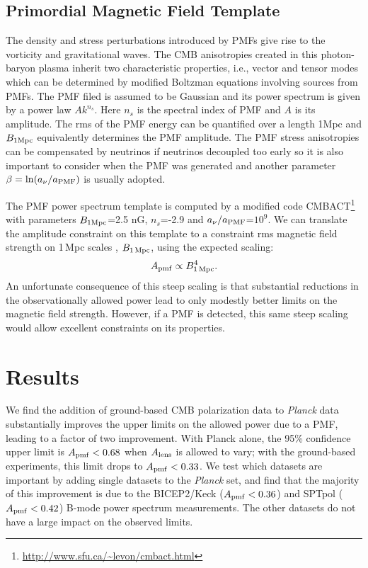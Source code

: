 \documentclass[preprint]{emulateapj}
\newcommand{\apmf}{\ensuremath{A_{\rm pmf}}}
\newcommand{\bpmf}{\ensuremath{B_{\rm 1\,Mpc}}}
\newcommand{\alens}{\ensuremath{A_{\rm lens}}}
\newcommand{\be}{\begin{equation}}
\newcommand{\ee}{\end{equation}}
\newcommand{\planck}{{\sl Planck}}
\newcommand{\bicepkeck}{BICEP2/Keck}
\newcommand{\sptpol}{SPTpol}
\begin{document}
\subsection{Primordial Magnetic Field Template}


The density and stress perturbations introduced by PMFs give rise to the vorticity and gravitational waves. 
The CMB anisotropies created in this photon-baryon plasma inherit two characteristic properties, i.e., vector and tensor modes which can be determined by modified Boltzman equations involving sources from PMFs. 
The PMF filed is assumed to be Gaussian and its power spectrum is given by a power law $Ak^{n_s}$. 
Here $n_s$ is the spectral index of PMF and $A$ is its amplitude. 
The rms of the PMF energy can be quantified over a length 1\rm{Mpc} and $B_{\rm{1Mpc}}$ equivalently determines the PMF amplitude. 
The PMF stress anisotropies can be compensated by neutrinos if neutrinos decoupled too early so it is also important to consider when the PMF was generated and another parameter $\beta=\ln(a_{\nu}/a_{\rm{PMF}})$ is usually adopted. 

The PMF power spectrum template is computed by a modified code CMBACT\footnote{\url{http://www.sfu.ca/~levon/cmbact.html}} \citep{pogosian99} with parameters $B_{\rm{1Mpc}}$=2.5 \rm{nG}, $n_s$=-2.9 and $a_{\nu}/a_{\rm{PMF}}$=$10^9$. 
We can translate the amplitude constraint on this template to a constraint rms magnetic field strength on 1\,Mpc scales , \bpmf, using the expected scaling:
\be
\apmf \propto \bpmf^4.
\ee
An unfortunate consequence of this steep scaling is that substantial reductions in the observationally allowed power lead to only modestly better limits on the magnetic field strength. 
However, if a PMF is detected, this same steep scaling would allow excellent constraints on its properties. 
 
\section{Results}
\label{sec:results}

We find the addition of ground-based CMB polarization data to \planck{} data substantially improves the upper limits on the allowed power due to a PMF, leading to a factor of two improvement. 
With Planck alone, the 95\% confidence upper limit is $\apmf <  0.68$ when $\alens$ is allowed to vary; with the ground-based experiments, this limit drops to $\apmf <  0.33$. 
We test which datasets are important by adding single datasets to the \planck{} set, and find that the majority of this improvement is due to the \bicepkeck{} ($\apmf <  0.36$) and \sptpol{} ($\apmf <  0.42$) B-mode power spectrum measurements. 
The other datasets do not have a large impact on the observed limits. 
\end{document}
